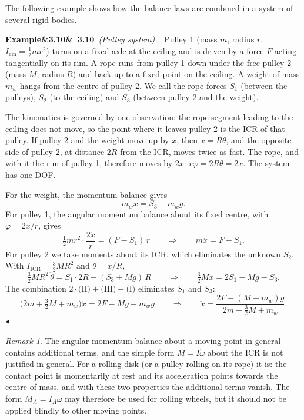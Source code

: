 \documentclass[11pt,a4paper,oneside]{report}
\numberwithin{equation}{chapter}
\newcommand{\cm}{\mathrm{cm}}
\theoremstyle{plain}
\theoremstyle{definition}
\theoremstyle{remark}
\newtheorem{remark}[theorem]{Remark}
\newenvironment{example}[2]{%
  \par\addvspace{\bigskipamount}\noindent
  \textbf{Example\ifx&#1&\else~#1\fi}\ \textit{(#2).}\ \ignorespaces}%
  {\hfill$\blacktriangleleft$\par\addvspace{\bigskipamount}}
\newcommand{\lecture}[2]{\marginpar{\raggedright\footnotesize\textsc{Lecture #1}\\\textit{#2}}}
\begin{document}
\lecture{12}{26.10.2026}
The following example shows how the balance laws are combined in a system of several rigid bodies.

\begin{example}{3.10}{Pulley system}
Pulley 1 (mass $m$, radius $r$, $I_\cm=\frac12mr^2$) turns on a fixed axle at the ceiling and is driven by a force $F$
acting tangentially on its rim. A rope runs from pulley 1 down under the free pulley 2 (mass $M$, radius $R$) and back up
to a fixed point on the ceiling. A weight of mass $m_w$ hangs from the centre of pulley 2. We call the rope forces $S_1$
(between the pulleys), $S_2$ (to the ceiling) and $S_3$ (between pulley 2 and the weight).

The kinematics is governed by one observation: the rope segment leading to the ceiling does not move, so the point
where it leaves pulley 2 is the ICR of that pulley. If pulley 2 and the weight move up by $x$, then $x=R\theta$, and the
opposite side of pulley 2, at distance $2R$ from the ICR, moves twice as fast. The rope, and with it the rim of pulley 1,
therefore moves by $2x$: $r\varphi=2R\theta=2x$. The system has one DOF.

For the weight, the momentum balance gives
\[
  m_w\ddot x=S_3-m_wg. \tag{I}
\]
For pulley 1, the angular momentum balance about its fixed centre, with $\ddot\varphi=2\ddot x/r$, gives
\[
  \tfrac12mr^2\cdot\frac{2\ddot x}{r}=(F-S_1)\,r\qquad\Longrightarrow\qquad m\ddot x=F-S_1 . \tag{II}
\]
For pulley 2 we take moments about its ICR, which eliminates the unknown $S_2$. With $I_{\text{ICR}}=\frac32MR^2$ and
$\ddot\theta=\ddot x/R$,
\[
  \tfrac32MR^2\,\ddot\theta=S_1\cdot2R-(S_3+Mg)\,R\qquad\Longrightarrow\qquad\tfrac32M\ddot x=2S_1-Mg-S_3 . \tag{III}
\]
The combination $2\cdot\text{(II)}+\text{(III)}+\text{(I)}$ eliminates $S_1$ and $S_3$:
\[
  \Big(2m+\tfrac32M+m_w\Big)\ddot x=2F-Mg-m_wg\qquad\Longrightarrow\qquad\ddot x=\frac{2F-(M+m_w)g}{2m+\frac32M+m_w}.
\]
\end{example}

\begin{remark}
The angular momentum balance about a moving point in general contains additional terms, and the simple form
$M=I\dot\omega$ about the ICR is not justified in general. For a rolling disk (or a pulley rolling on its rope) it is:
the contact point is momentarily at rest and its acceleration points towards the centre of mass, and with these two
properties the additional terms vanish. The form $M_A=I_A\dot\omega$ may therefore be used for rolling wheels, but it
should not be applied blindly to other moving points.
\end{remark}
\end{document}
